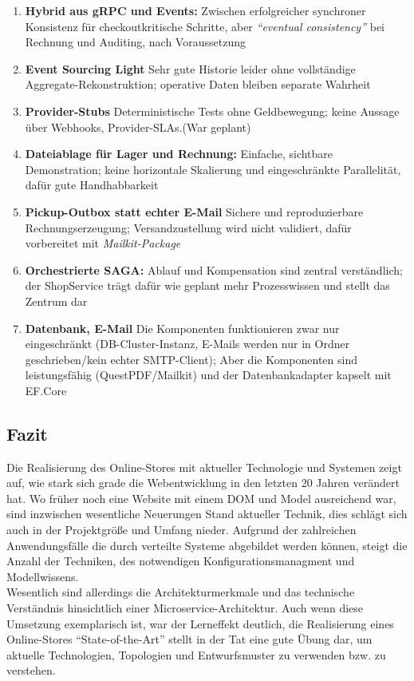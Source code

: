 \documentclass[10pt,a4paper]{article}
\newcommand{\midGap}{\vspace{12mm}}
\newcommand{\term}[1]{\textsf{\textbf{#1}}}
\begin{document}
\begin{enumerate}
  \item \term{Hybrid aus gRPC und Events:} 
		Zwischen erfolgreicher synchroner Konsistenz für checkoutkritische Schritte, aber \emph{"`eventual consistency"'} bei Rechnung und 
		Auditing, nach Voraussetzung
  \item \term{Event Sourcing Light}
		Sehr gute Historie leider ohne vollständige Aggregate-Rekonstruktion; operative Daten bleiben separate Wahrheit		
  \item \term{Provider-Stubs} 
		Deterministische Tests ohne Geldbewegung; keine Aussage über Webhooks, Provider-SLAs.(War geplant)
  \item \term{Dateiablage für Lager und Rechnung:}
		Einfache, sichtbare Demonstration; keine horizontale Skalierung und eingeschränkte Parallelität, dafür gute Handhabbarkeit
  \item \term{Pickup-Outbox statt echter E-Mail} 
		Sichere und reproduzierbare Rechnungserzeugung; Versandzustellung wird nicht validiert, dafür vorbereitet mit \emph{Mailkit-Package}
  \item \term{Orchestrierte SAGA:} 
		Ablauf und Kompensation sind zentral verständlich; der ShopService trägt dafür wie geplant mehr Prozesswissen und stellt das Zentrum dar
	\item \term{Datenbank, E-Mail} 
		Die Komponenten funktionieren zwar nur eingeschränkt (DB-Cluster-Instanz, E-Mails werden nur in Ordner geschrieben/kein echter SMTP-Client); Aber die Komponenten sind leistungsfähig (QuestPDF/Mailkit) und der Datenbankadapter kapselt mit EF.Core
\end{enumerate}

\midGap


\subsection{Fazit}

Die Realisierung des Online-Stores mit aktueller Technologie und Systemen zeigt auf, wie stark sich grade die Webentwicklung in den letzten 20 Jahren verändert hat. Wo früher noch eine Website mit einem DOM und Model ausreichend war, sind inzwischen wesentliche Neuerungen Stand aktueller Technik, dies schlägt sich auch in der Projektgröße und Umfang nieder. Aufgrund der zahlreichen Anwendungsfälle die durch verteilte Systeme abgebildet werden können, steigt die Anzahl der Techniken, des notwendigen Konfigurationsmanagment und Modellwissens.\\
Wesentlich sind allerdings die Architekturmerkmale und das technische Verständnis hinsichtlich einer Microservice-Architektur. Auch wenn diese Umsetzung exemplarisch ist, war der Lerneffekt deutlich, die Realisierung eines Online-Stores "`State-of-the-Art"' stellt in der Tat eine gute Übung dar, um aktuelle Technologien, Topologien und Entwurfsmuster zu verwenden bzw. zu verstehen.\\
\end{document}
